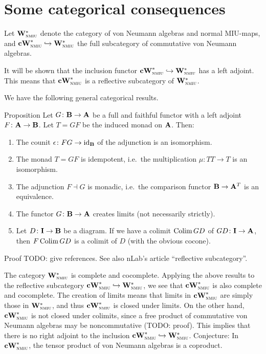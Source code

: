 \documentclass[a]{subfiles}
\begin{document}
\section{Some categorical consequences}

\begin{parsec}%
\begin{point}%
Let $\mathbf{W}^*_{\text{\textsc{nmiu}}}$ denote the category of von Neumann algebras
and normal MIU-maps, and $\mathbf{cW}^*_{\text{\textsc{nmiu}}}\hookrightarrow\mathbf{W}^*_{\text{\textsc{nmiu}}}$
the full subcategory of commutative von Neumann algebras.

It will be shown that the inclusion functor
$\mathbf{cW}^*_{\text{\textsc{nmiu}}}\hookrightarrow\mathbf{W}^*_{\text{\textsc{nmiu}}}$ has a left adjoint.
This means that $\mathbf{cW}^*_{\text{\textsc{nmiu}}}$ is a reflective subcategory of $\mathbf{W}^*_{\text{\textsc{nmiu}}}$.

We have the following general categorical results.
\end{point}
\begin{point}{Proposition}%
Let $G\colon\mathbf{B}\to\mathbf{A}$ be a full and faithful functor
with a left adjoint $F\colon\mathbf{A}\to\mathbf{B}$.
Let $T=GF$ be the induced monad on $\mathbf{A}$.
Then:
\begin{enumerate}
\item
The counit $\epsilon\colon FG\to\operatorname{id}_{\mathbf{B}}$
of the adjunction is an isomorphism.
\item
The monad $T=GF$ is idempotent,
i.e.\ the multiplication $\mu\colon TT\to T$
is an isomorphism.
\item
The adjunction $F\dashv G$ is monadic,
i.e.\ the comparison functor $\mathbf{B}\to\mathbf{A}^{T}$
is an equivalence.
\item
The functor $G\colon\mathbf{B}\to\mathbf{A}$ creates limits
(not necessarily strictly).
\item
Let $D\colon\mathbf{I}\to\mathbf{B}$ be a diagram.
If we have a colimit $\operatorname{Colim} GD$ of $GD\colon\mathbf{I}\to\mathbf{A}$,
then $F\operatorname{Colim} GD$ is a colimit of $D$
(with the obvious cocone).
\end{enumerate}
\begin{point}{Proof}%
TODO: give references.
See also nLab's article ``reflective subcategory''.
\end{point}
\end{point}
\begin{point}%
The category $\mathbf{W}^*_{\text{\textsc{nmiu}}}$ is complete and cocomplete.
Applying the above results to
the reflective subcategory $\mathbf{cW}^*_{\text{\textsc{nmiu}}}\hookrightarrow\mathbf{W}^*_{\text{\textsc{nmiu}}}$,
we see that $\mathbf{cW}^*_{\text{\textsc{nmiu}}}$ is also complete and cocomplete.
The creation of limits means
that limits in $\mathbf{cW}^*_{\text{\textsc{nmiu}}}$ are simply those in $\mathbf{W}^*_{\text{\textsc{nmiu}}}$,
and thus $\mathbf{cW}^*_{\text{\textsc{nmiu}}}$ is closed under limits.
On the other hand, $\mathbf{cW}^*_{\text{\textsc{nmiu}}}$ is not closed under colimits,
since a free product of commutative von Neumann algebras
may be noncommutative (TODO: proof). This implies that
there is no right adjoint to
the inclusion $\mathbf{cW}^*_{\text{\textsc{nmiu}}}\hookrightarrow\mathbf{W}^*_{\text{\textsc{nmiu}}}$.
Conjecture: In $\mathbf{cW}^*_{\text{\textsc{nmiu}}}$,
the tensor product of von Neumann algebras
is a coproduct.
\end{point}
\end{parsec}
\end{document}
